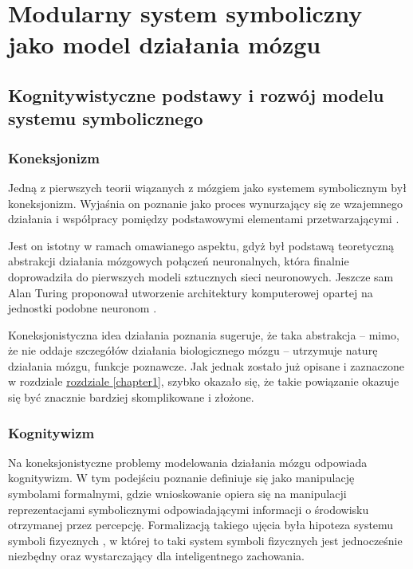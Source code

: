 \chapter{Modularny system symboliczny jako model działania mózgu}


\section{Kognitywistyczne podstawy i rozwój modelu systemu symbolicznego}
\label{cognitive-basics}

\subsection{Koneksjonizm}

Jedną z pierwszych teorii wiązanych z mózgiem jako systemem symbolicznym był koneksjonizm.
Wyjaśnia on poznanie jako proces wynurzający się ze wzajemnego działania i współpracy pomiędzy podstawowymi elementami przetwarzającymi \cite{bechtel1993case}.

Jest on istotny w ramach omawianego aspektu, gdyż był podstawą teoretyczną abstrakcji działania mózgowych połączeń neuronalnych, która finalnie doprowadziła do pierwszych modeli sztucznych sieci neuronowych.
Jeszcze sam Alan Turing proponował utworzenie architektury komputerowej opartej na jednostki podobne neuronom \cite{copeland1996alan}.

Koneksjonistyczna idea działania poznania sugeruje, że taka abstrakcja -- mimo, że nie oddaje szczegółów działania biologicznego mózgu -- utrzymuje naturę działania mózgu, funkcje poznawcze.
Jak jednak zostało już opisane i zaznaczone w rozdziale \hyperref[chapter1]{rozdziale \ref*{chapter1}}, szybko okazało się, że takie powiązanie okazuje się być znacznie bardziej skomplikowane i złożone.

\subsection{Kognitywizm}

Na koneksjonistyczne problemy modelowania działania mózgu odpowiada kognitywizm.
W tym podejściu poznanie definiuje się jako manipulację symbolami formalnymi, gdzie wnioskowanie opiera się na manipulacji reprezentacjami symbolicznymi odpowiadającymi informacji o środowisku otrzymanej przez percepcję.
Formalizacją takiego ujęcia była hipoteza systemu symboli fizycznych \cite{newell2007computer}, w której to taki system symboli fizycznych jest jednocześnie niezbędny oraz wystarczający dla inteligentnego zachowania.

